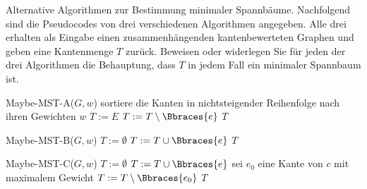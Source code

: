
\newpage

\begin{exercise}

Alternative Algorithmen zur Bestimmung minimaler Spannbäume.
Nachfolgend sind die Pseudocodes von drei verschiedenen Algorithmen angegeben.
Alle drei erhalten als Eingabe einen zusammenhängenden kantenbewerteten Graphen und geben eine Kantenmenge $T$ zurück.
Beweisen oder widerlegen Sie für jeden der drei Algorithmen die Behauptung, dass $T$ in jedem Fall ein minimaler Spannbaum ist.

\begin{algorithmic}
    \State Maybe-MST-A($G, w$)
    \State sortiere die Kanten in nichtsteigender Reihenfolge nach ihren Gewichten $w$
    \State $T := E$
            \State $T := T \setminus \Bbraces{e}$
        \EndIf
    \EndFor
    \State \Return $T$
\end{algorithmic}

\begin{algorithmic}
    \State Maybe-MST-B($G, w$)
    \State $T := \emptyset$
            \State $T := T \cup \Bbraces{e}$
        \EndIf
    \EndFor
    \State \Return $T$
\end{algorithmic}

\begin{algorithmic}
    \State Maybe-MST-C($G, w$)
    \State $T := \emptyset$
        \State $T := T \cup \Bbraces{e}$
            \State sei $e_0$ eine Kante von $c$ mit maximalem Gewicht
            \State $T := T \setminus \Bbraces{e_0}$
        \EndIf
    \EndFor
    \State \Return $T$
\end{algorithmic}

\end{exercise}


